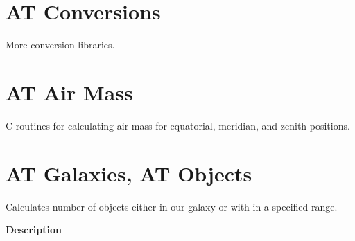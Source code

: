 \section {AT Conversions}  
More conversion libraries.

\section {AT Air Mass}  
C routines for calculating air mass for equatorial, meridian, and zenith positions.  

\section {AT Galaxies, AT Objects}
Calculates number of objects either in our galaxy or with in a specified range.  

\textbf{Description} 